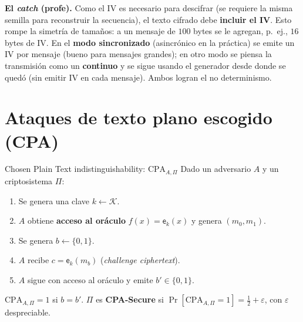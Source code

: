 \documentclass[11pt,a4paper]{article}
\newcommand{\Kset}{\mathcal{K}}
\newcommand{\E}{\mathsf{e}}
\newcommand{\bits}{\{0,1\}}
\begin{document}
\begin{slidebox}
\textbf{El \emph{catch} (profe).} Como el IV es necesario para descifrar (se requiere la
misma semilla para reconstruir la secuencia), el texto cifrado debe \textbf{incluir el
IV}. Esto rompe la simetría de tamaños: a un mensaje de $100$ bytes se le agregan, p.\
ej., $16$ bytes de IV. En el \textbf{modo sincronizado} (asincrónico en la práctica) se
emite un IV por mensaje (bueno para mensajes grandes); en otro modo se piensa la
transmisión como un \textbf{continuo} y se sigue usando el generador desde donde se quedó
(sin emitir IV en cada mensaje). Ambos logran el no determinismo.
\end{slidebox}

\section{Ataques de texto plano escogido (CPA)}

\begin{defbox}{Chosen Plain Text indistinguishability: $\mathrm{CPA}_{A,\Pi}$}
Dado un adversario $A$ y un criptosistema $\Pi$:
\begin{enumerate}[leftmargin=1.6em,itemsep=2pt]
  \item Se genera una clave $k\leftarrow\Kset$.
  \item $A$ obtiene \textbf{acceso al oráculo} $f(x)=\E_k(x)$ y genera $(m_0,m_1)$.
  \item Se genera $b\leftarrow\bits$.
  \item $A$ recibe $c=\E_k(m_b)$ (\emph{challenge ciphertext}).
  \item $A$ sigue con acceso al oráculo y emite $b'\in\bits$.
\end{enumerate}
$\mathrm{CPA}_{A,\Pi}=1$ si $b=b'$. $\Pi$ es \textbf{CPA-Secure} si
$\Pr[\mathrm{CPA}_{A,\Pi}=1]=\tfrac12+\varepsilon$, con $\varepsilon$ despreciable.
\end{defbox}
\end{document}
